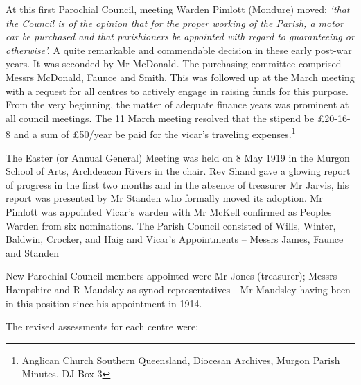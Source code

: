 At this first Parochial Council, meeting Warden Pimlott (Mondure) moved: \emph{`that the Council is of the opinion that for the proper working of the Parish, a motor car be purchased and that parishioners be appointed with regard to guaranteeing or otherwise'.} A quite remarkable and commendable decision in these early post-war years. It was seconded by Mr McDonald. The purchasing committee comprised Messrs McDonald, Faunce and Smith. This was followed up at the March meeting with a request for all centres to actively engage in raising funds for this purpose. From the very beginning, the matter of adequate finance years was prominent at all council meetings. The 11 March meeting resolved that the stipend be \pounds20-16-8 and a sum of \pounds50/year be paid for the vicar's traveling expenses.\footnote{Anglican Church Southern Queensland, Diocesan Archives, Murgon Parish Minutes, DJ Box 3}


The Easter (or Annual General) Meeting was held on 8 May 1919 in the Murgon School of Arts, Archdeacon Rivers in the chair. Rev Shand gave a glowing report of progress in the first two months and in the absence of treasurer Mr Jarvis, his report was presented by Mr Standen who formally moved its adoption. Mr Pimlott was appointed Vicar's warden with Mr McKell confirmed as Peoples Warden from six nominations. The Parish Council consisted of Wills, Winter, Baldwin, Crocker, and Haig and Vicar's Appointments -- Messrs James, Faunce and Standen



New Parochial Council members appointed were Mr Jones (treasurer); Messrs Hampshire and R Maudsley as synod representatives - Mr Maudsley having been in this position since his appointment in 1914.



The revised assessments for each centre were:



